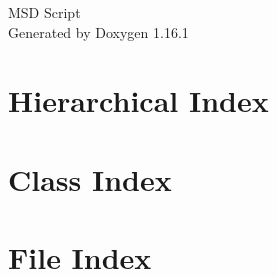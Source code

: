 \documentclass[twoside]{book}
\newcommand{\+}{\discretionary{\mbox{\scriptsize$\hookleftarrow$}}{}{}}
\newcommand{\clearemptydoublepage}{%
    \newpage{\pagestyle{empty}\cleardoublepage}%
  }
\begin{document}
  \raggedbottom
    \hypersetup{pageanchor=false,
                bookmarksnumbered=true,
                pdfencoding=unicode
               }
  \begin{titlepage}
  \vspace*{7cm}
  \begin{center}%
  {\Large MSD Script}\\
  \vspace*{1cm}
  {\large Generated by Doxygen 1.16.1}\\
  \end{center}
  \end{titlepage}
  \clearemptydoublepage
  \tableofcontents
  \clearemptydoublepage
  \hypersetup{pageanchor=true}
\chapter{Hierarchical Index}

\chapter{Class Index}

\chapter{File Index}

\end{document}
